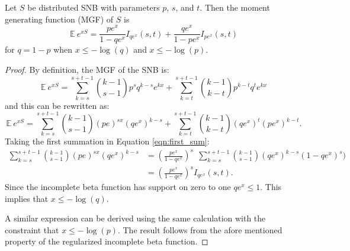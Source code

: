 \documentclass[12pt]{article}         %
\begin{document}
\begin{prop} Let $S$ be distributed SNB with parameters $p$, $s$, and $t$.
Then the moment generating function (MGF) of $S$ is
\begin{equation} \label{eqn:mgf}
\mathbb{E}~e^{xS} = \frac{p e^x}{1 - qe^x} I_{qe^x} (s, t) + \frac{qe^x}{1-pe^x} I_{pe^x}(s, t)
\end{equation}
for $q = 1-p$ when $x \leq -\log(q)$ and $x \leq -\log(p)$.
\end{prop}
\begin{proof}
By definition, the MGF of the SNB is:
\begin{equation*}
\mathbb{E}~e^{xS} = \sum_{k=s}^{s+t-1} {k-1 \choose s-1} p^s q^{k-s} e^{kx} 
  + \sum_{k=t}^{s+t-1} {k-1 \choose k-t} p^{k-t} q^t e^{kx}
\end{equation*}
and this can be rewritten as:
\begin{equation} \label{eqn:first_sum}
\mathbb{E}~e^{xS} = \sum_{k=s}^{s+t-1}{k-1 \choose s-1} (pe)^{sx} (qe^x)^{k-s} 
  + \sum_{k=t}^{s+t-1}{k-1 \choose k-t} (qe^x)^t (pe^x)^{k-t}.
\end{equation}
Taking the first summation in Equation \ref{eqn:first_sum}:
\begin{align*}
\sum_{k=s}^{s+t-1}{k-1 \choose s-1} (pe)^{sx} (qe^x)^{k-s} &= 
  \left(\frac{pe^x}{1 - qe^x}\right)^s \ \ \sum_{k=s}^{s+t-1} {k-1 \choose s-1} 
    (qe^x)^{k-s} (1-qe^x)^s) \\
  &= \left(\frac{pe^x}{1 - qe^x}\right)^s I_{qe^x}(s, t).
\end{align*}
Since the incomplete beta function has support on zero to one 
$qe^x \leq 1$. This implies that $x \leq -\log(q)$.

A similar expression can be derived using the same calculation with 
the constraint that $x \leq -\log(p)$. The result
follows from the afore mentioned property of the regularized incomplete
beta function.
\end{proof}
\end{document}
